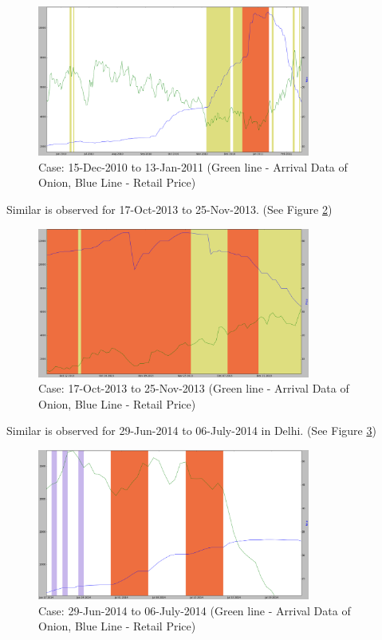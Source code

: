 \begin{itemize}
	\begin{figure}[H]
	\centering
	\includegraphics[width=0.8\textwidth]{graphs/Mumbai_RetailvsArrival_ill1.png}
	\caption{Case: 15-Dec-2010 to 13-Jan-2011 (Green line - Arrival Data of Onion, Blue Line - Retail Price)}
	\label{fig:Mumbai_RetailvsArrival_ill1}
	\end{figure}

Similar is observed for 17-Oct-2013 to 25-Nov-2013. (See Figure \ref{fig:Mumbai_RetailvsArrival_ill2})

	\begin{figure}[H]
	\centering
	\includegraphics[width=0.8\textwidth]{graphs/Mumbai_RetailvsArrival_ill2.png}
	\caption{Case: 17-Oct-2013 to 25-Nov-2013 (Green line - Arrival Data of Onion, Blue Line - Retail Price)}
	\label{fig:Mumbai_RetailvsArrival_ill2}
	\end{figure}

Similar is observed for 29-Jun-2014 to 06-July-2014 in Delhi. (See Figure \ref{fig:Delhi_RetailvsArrival_ill1})

	\begin{figure}[H]
	\centering
	\includegraphics[width=0.8\textwidth]{graphs/Delhi_RetailvsArrival_ill1.png}
	\caption{Case: 29-Jun-2014 to 06-July-2014 (Green line - Arrival Data of Onion, Blue Line - Retail Price)}
	\label{fig:Delhi_RetailvsArrival_ill1}
	\end{figure}


\end{itemize}
